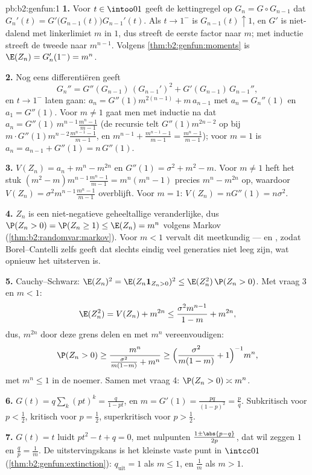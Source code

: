 \begin{solution}{pb:b2:genfun:1}
\textbf{1.} Voor $t \in \intoo01$ geeft de kettingregel op $G_n = G
\circ G_{n-1}$ dat $G_n'(t) = G'\bigl(G_{n-1}(t)\bigr)G_{n-1}'(t)$.
Als $t \to 1^-$ is $G_{n-1}(t) \uparrow 1$, en $G'$ is niet-dalend
met linkerlimiet $m$ in $1$, dus streeft de eerste factor naar $m$;
met inductie streeft de tweede naar $m^{n-1}$. Volgens
\cref{thm:b2:genfun:moments} is $\E(Z_n) = G_n'(1^-) = m^n$.

\textbf{2.} Nog eens differentiëren geeft
\[
G_n'' = G''(G_{n-1})\,(G_{n-1}')^2 +
G'(G_{n-1})\,G_{n-1}'',
\]
en $t \to 1^-$ laten gaan: $a_n = G''(1)m^{2(n-1)} + m\, a_{n-1}$
met $a_n = G_n''(1)$ en $a_1 = G''(1)$. Voor $m \neq 1$ gaat men
met inductie na dat $a_n = G''(1)\,m^{n-1} \frac{m^n - 1}{m - 1}$
(de recursie telt $G''(1)m^{2n-2}$ op bij $m\cdot
G''(1)m^{n-2}\frac{m^{n-1}-1}{m-1}$, en $m^{n-1} +
\frac{m^{n-1}-1}{m-1} = \frac{m^n - 1}{m-1}$); voor $m = 1$ is $a_n
= a_{n-1} + G''(1) = n\,G''(1)$.

\textbf{3.} $V(Z_n) = a_n + m^n - m^{2n}$ en $G''(1) = \sigma^2 +
m^2 - m$. Voor $m \neq 1$ heft het stuk $(m^2 -
m)m^{n-1}\frac{m^n-1}{m-1} = m^n(m^n - 1)$ precies $m^n - m^{2n}$
op, waardoor $V(Z_n) = \sigma^2m^{n-1}\frac{m^n-1}{m-1}$
overblijft. Voor $m = 1$: $V(Z_n) = nG''(1) = n\sigma^2$.

\textbf{4.} $Z_n$ is een niet-negatieve geheeltallige
veranderlijke, dus $\P(Z_n > 0) = \P(Z_n \geq 1) \leq \E(Z_n) =
m^n$ volgens Markov (\cref{thm:b2:randomvar:markov}). Voor $m < 1$
vervalt dit meetkundig --- en , zodat Borel--Cantelli
zelfs geeft dat slechts eindig veel generaties niet leeg zijn, wat
opnieuw het uitsterven is.

\textbf{5.} Cauchy--Schwarz: $\E(Z_n)^2 = \E(Z_n\mathbf
1_{Z_n>0})^2 \leq \E(Z_n^2)\,\P(Z_n > 0)$. Met vraag 3 en $m < 1$:
\[
\E(Z_n^2) = V(Z_n) + m^{2n}
\leq \frac{\sigma^2m^{n-1}}{1-m} + m^{2n},
\]
dus, $m^{2n}$ door deze grens delen en met $m^n$ vereenvoudigen:
\[
\P(Z_n > 0) \geq \frac{m^n}{\frac{\sigma^2}{m(1-m)} + m^n}
\geq \Bigl(\frac{\sigma^2}{m(1-m)} + 1\Bigr)^{-1}m^n ,
\]
met $m^n \leq 1$ in de noemer. Samen met vraag 4: $\P(Z_n > 0)
\asymp m^n$.

\textbf{6.} $G(t) = q\sum_k(pt)^k = \frac{q}{1 - pt}$, en $m =
G'(1) = \frac{pq}{(1-p)^2} = \frac pq$. Subkritisch voor $p <
\frac12$, kritisch voor $p = \frac12$, superkritisch voor $p >
\frac12$.

\textbf{7.} $G(t) = t$ luidt $pt^2 - t + q = 0$, met nulpunten
$\frac{1 \pm \abs{p - q}}{2p}$, dat wil zeggen $1$ en $\frac qp =
\frac1m$. De uitstervingskans is het kleinste vaste punt in
$\intcc01$ (\cref{thm:b2:genfun:extinction}): $q_{\mathrm{uit}} =
1$ als $m \leq 1$, en $\frac1m$ als $m > 1$.


\end{solution}
